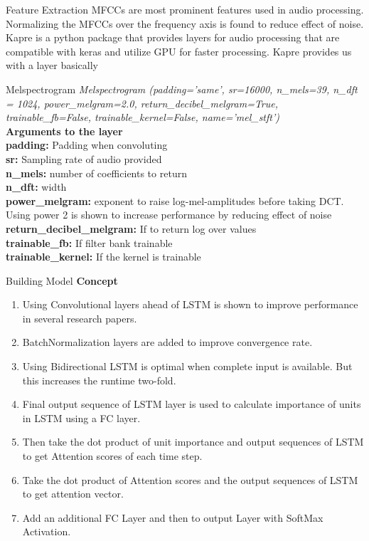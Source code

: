 \documentclass[11pt]{beamer}
\begin{document}
\begin{frame}
{Feature Extraction}
MFCCs are most prominent features used in audio processing.
Normalizing the MFCCs over the frequency axis is found to reduce effect of noise.\\
Kapre is a python package that provides layers for audio processing that are compatible with keras and utilize GPU for faster processing. Kapre provides us with a layer basically\\


\end{frame}


\begin{frame}
{Melspectrogram}
\textit{Melspectrogram (padding='same', sr=16000, n\_mels=39, n\_dft = 1024, power\_melgram=2.0, return\_decibel\_melgram=True, trainable\_fb=False, trainable\_kernel=False,  name='mel\_stft')}\\

\textbf{Arguments to the layer}\\
\textbf{padding:} Padding when convoluting\\
\textbf{sr:} Sampling rate of audio provided\\
\textbf{n\_mels:} number of coefficients to return\\
\textbf{n\_dft:} width \\
\textbf{power\_melgram:} exponent to raise log-mel-amplitudes before taking DCT. Using power 2 is shown to increase performance by reducing effect of noise\\
\textbf{return\_decibel\_melgram:} If to return log over values\\
\textbf{trainable\_fb:} If filter bank trainable\\
\textbf{trainable\_kernel:} If the kernel is trainable
\end{frame}

\begin{frame}
{Building Model}
\textbf{Concept}
\begin{enumerate}
    \item Using Convolutional layers ahead of LSTM is shown to improve performance in several research papers.
    \item BatchNormalization layers are added to improve convergence rate.
    \item Using Bidirectional LSTM is optimal when complete input is available. But this increases the runtime two-fold.
    \item Final output sequence of LSTM layer is used to calculate importance of units in LSTM using a FC layer.
    \item Then take the dot product of unit importance and output sequences of LSTM to get Attention scores of each time step.
    \item Take the dot product of Attention scores and the output sequences of LSTM to get attention vector.
    \item Add an additional FC Layer and then to output Layer with SoftMax Activation.
\end{enumerate}
\end{frame}
\end{document}
